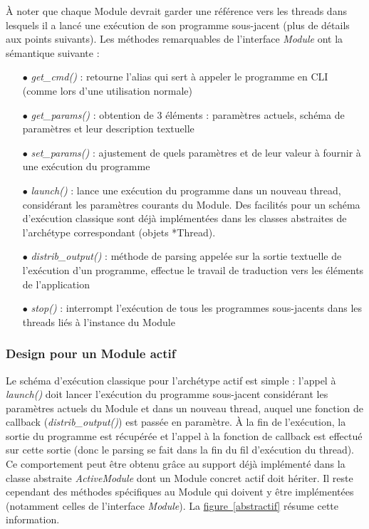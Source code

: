 \documentclass[]{article}
\newcommand{\wordlink}[2]{\hyperref[#1]{#2~\ref{#1}}}
\begin{document}
À noter que chaque Module devrait garder une référence vers les threads dans lesquels il a lancé une exécution de son programme sous-jacent (plus de détails aux points suivants).
Les méthodes remarquables de l'interface \textit{Module} ont la sémantique suivante :
\vspace{0.1cm}
\begin{itemize}
\item[$\bullet$] \textit{get\_cmd()} : retourne l'alias qui sert à appeler le programme en CLI (comme lors d'une utilisation normale)
\item[$\bullet$] \textit{get\_params()} : obtention de 3 éléments : paramètres actuels, schéma de paramètres et leur description textuelle  
\item[$\bullet$] \textit{set\_params()} : ajustement de quels paramètres et de leur valeur à fournir à une exécution du programme
\vspace{0.2cm}
\item[$\bullet$] \textit{launch()} : lance une exécution du programme dans un nouveau thread, considérant les paramètres courants du Module. Des facilités pour un schéma d'exécution classique sont déjà implémentées dans les classes abstraites de l'archétype correspondant (objets *Thread).
\vspace{0.1cm}
\item[$\bullet$] \textit{distrib\_output()} : méthode de parsing appelée sur la sortie textuelle de l'exécution d'un programme, effectue le travail de traduction vers les éléments de l'application
\vspace{0.1cm}
\item[$\bullet$] \textit{stop()} : interrompt l'exécution de tous les programmes sous-jacents dans les threads liés à l'instance du Module
\end{itemize}
    
\subsubsection{Design pour un Module actif}

Le schéma d'exécution classique pour l'archétype actif est simple : l'appel à \textit{launch()} doit lancer l'exécution du programme sous-jacent considérant les paramètres actuels du Module et dans un nouveau thread, auquel une fonction de callback (\textit{distrib\_output()}) est passée en paramètre. À la fin de l'exécution, la sortie du programme est récupérée et l'appel à la fonction de callback est effectué sur cette sortie (donc le parsing se fait dans la fin du fil d'exécution du thread). Ce comportement peut être obtenu grâce au support déjà implémenté dans la classe abstraite \textit{ActiveModule} dont un Module concret actif doit hériter. Il reste cependant des méthodes spécifiques au Module qui doivent y être implémentées (notamment celles de l'interface \textit{Module}). La \wordlink{abstractif}{figure} résume cette information.
\end{document}
